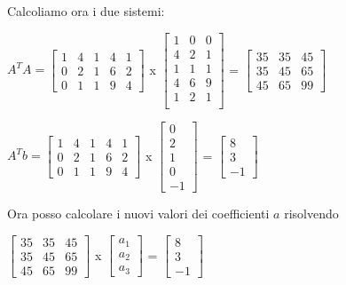 \noindent Calcoliamo ora i due sistemi: \\
\begin{center}
$ A^TA = \begin{bmatrix}
1 & 4 & 1 & 4 & 1 \\
0 & 2 & 1 & 6 & 2 \\
0 & 1 & 1 & 9 & 4   
\end{bmatrix} $
x
$\begin{bmatrix}
1 & 0 & 0 \\
4 & 2 & 1 \\
1 & 1 & 1 \\
4 & 6 & 9 \\
1 & 2 & 1 \\
\end{bmatrix}
$
=
$\begin{bmatrix}
35 & 35 & 45 \\
35 & 45 & 65 \\
45 & 65 & 99 
\end{bmatrix}
$
\end{center}

\begin{center}
$ A^Tb = \begin{bmatrix}
1 & 4 & 1 & 4 & 1 \\
0 & 2 & 1 & 6 & 2 \\
0 & 1 & 1 & 9 & 4   
\end{bmatrix} $
x
$ \begin{bmatrix}
0 \\ 2 \\ 1 \\ 0 \\ -1
\end{bmatrix}
$
=
$ \begin{bmatrix}
8 \\ 3 \\ -1
\end{bmatrix}$
\end{center}

\newpage
Ora posso calcolare i nuovi valori dei coefficienti $a$ risolvendo

\begin{center}
$\begin{bmatrix}
35 & 35 & 45 \\
35 & 45 & 65 \\
45 & 65 & 99 
\end{bmatrix}
$
x
$\begin{bmatrix}
a_1 \\ a_2 \\ a_3
\end{bmatrix}
$
=
$ \begin{bmatrix}
8 \\ 3 \\ -1
\end{bmatrix}
$
\end{center}

